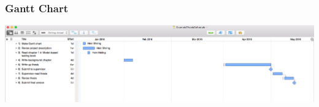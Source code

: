 \documentclass[hyperref={pdfpagelabels=false}, aspectratio=1610,handout]{beamer}
\begin{document}
\begin{frame}
\frametitle{Gantt Chart}
 \begin{center}
  \includegraphics[scale=0.25]{fig/gantt-example}
 \end{center}
\end{frame}



%
%
%
%
%
\end{document}
